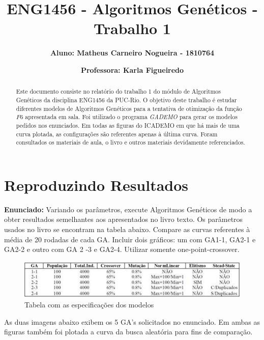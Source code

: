 \documentclass[12pt]{article}
\title{\textbf{ENG1456 - Algoritmos Genéticos - Trabalho 1}}
\author{\textbf{Aluno: Matheus Carneiro Nogueira - 1810764}}
\affil{}
\author{\textbf{Professora: Karla Figueiredo}}
\affil{}
\date{}
\begin{document}
	\maketitle
	\tableofcontents
	
	
	\begin{abstract}
		Este documento consiste no relatório do trabalho 1 do módulo de Algoritmos Genéticos da disciplina ENG1456 da PUC-Rio. O objetivo deste trabalho é estudar diferentes modelos de Algoritmos Genéticos para a tentativa de otimização da função $F6$ apresentada em sala. Foi utilizado o programa \textit{GADEMO} para gerar os modelos pedidos nos enunciados. Em todas as figuras do ICADEMO em que há mais de uma curva plotada, as configurações são referentes apenas à última curva. Foram consultados os materiais de aula, o livro \cite{davis1991handbook} e outros materiais devidamente referenciados.
	\end{abstract}
	
\section{Reproduzindo Resultados}

\textbf{Enunciado:}
Variando os parâmetros, execute Algoritmos Genéticos de modo a obter resultados semelhantes aos apresentados no livro texto. Os parâmetros usados no livro se encontram na tabela abaixo. Compare as curvas referentes à média de 20 rodadas de cada GA. Incluir dois gráficos: um com GA1-1, GA2-1 e GA2-2 e outro com GA 2 -3 e GA2-4. Utilizar somente one-point-crossover.

\begin{figure}[H]
	\centering
	\includegraphics[width=0.9\linewidth]{Imagens/tabela_especificacao_modelos}
	\caption{Tabela com as especificações dos modelos}
	\label{fig:tabelaespecificacaomodelos}
\end{figure}


As duas imagens abaixo exibem os 5 GA's solicitados no enunciado. Em ambas as figuras também foi plotada a curva da busca aleatória para fins de comparação.
\end{document}
